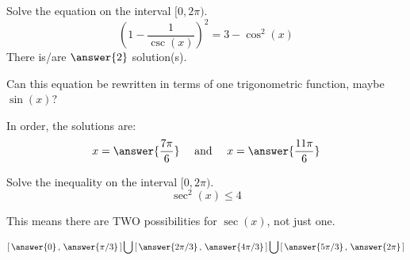 \documentclass{ximera}
\author{Bobby Ramsey}
\begin{document}
\begin{exercise}
	Solve the equation on the interval $[0, 2\pi)$.
	\[ \left( 1 - \frac{1}{\csc(x) } \right)^2  = 3 - \cos^2(x)\]
	There is/are $\answer{2}$ solution(s).
	\begin{hint}
		Can this equation be rewritten in terms of one trigonometric function, maybe $\sin(x)$?
	\end{hint}
	\begin{exercise}
		In order, the solutions are:
		\[ x = \answer{\frac{7\pi}{6} } \quad \text{ and } \quad x = \answer{\frac{11\pi}{6}} \]
	\end{exercise}
\end{exercise}

\begin{exercise}
	Solve the inequality on the interval $[0,2\pi)$.
	\[ \sec^2(x) \leq 4 \]
	\begin{hint}
		This means there are TWO possibilities for $\sec(x)$, not just one.
	\end{hint}
	\[ \left[ \,\answer{0} \, , \, \answer{\pi/3} \, \right] \bigcup \left[ \,\answer{2\pi/3} \, , \, \answer{4\pi/3} \, \right] \bigcup \left[ \,\answer{5\pi/3} \, , \, \answer{2\pi} \, \right] \]
	
\end{exercise}
\end{document}
